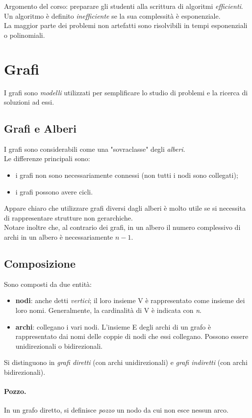 Argomento del corso: preparare gli studenti alla scrittura di algoritmi \textit{efficienti}.
Un algoritmo è definito \textit{inefficiente} se la sua complessità è esponenziale.\\
La maggior parte dei problemi non artefatti sono risolvibili in tempi esponenziali o polinomiali.

\section{Grafi}
I grafi sono \textit{modelli} utilizzati per semplificare lo studio di problemi e la ricerca di soluzioni ad essi.
\subsection{Grafi e Alberi}
I grafi sono considerabili come una "sovraclasse" degli \textit{alberi}. \\
Le differenze principali sono:
\begin{itemize}
	\item i grafi non sono necessariamente connessi (non tutti i nodi sono collegati);
	\item i grafi possono avere cicli.
	
\end{itemize}
Appare chiaro che utilizzare grafi diversi dagli alberi è molto utile se si necessita di rappresentare strutture non gerarchiche. \\
Notare inoltre che, al contrario dei grafi, in un albero il numero complessivo di archi in un albero è necessariamente $ n-1 $.


\subsection{Composizione}
Sono composti da due entità:
\begin{itemize}
	\item \textbf{nodi}: anche detti \textit{vertici}; il loro insieme V è rappresentato come insieme dei loro nomi. Generalmente, la cardinalità di V è indicata con \textit{n}.
	\item \textbf{archi}: collegano i vari nodi. L'insieme E degli archi di un grafo è rappresentato dai nomi delle coppie di nodi che essi collegano. Possono essere unidirezionali o bidirezionali.
\end{itemize}
Si distinguono in \textit{grafi diretti} (con archi unidirezionali) e \textit{grafi indiretti} (con archi bidirezionali).
\paragraph{Pozzo.}
In un grafo diretto, si definisce \textit{pozzo} un nodo da cui non esce nessun arco.
